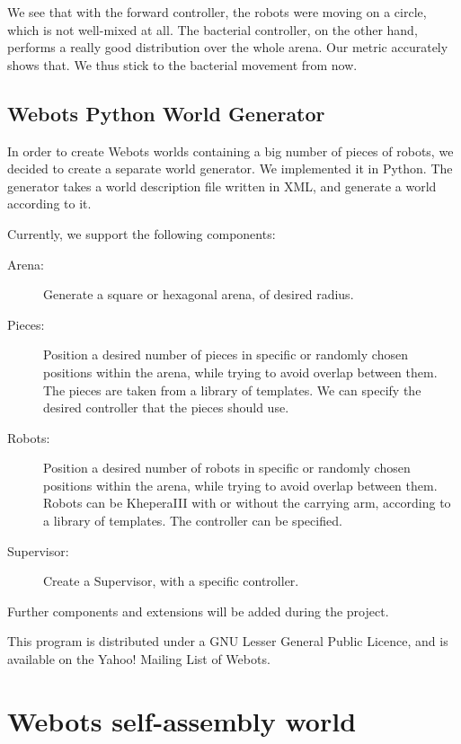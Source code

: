 \documentclass[letterpaper, oneside]{article}
\begin{document}
We see that with the forward controller, the robots were moving on a circle, which is not well-mixed at all. The bacterial controller, on the other hand, performs a really good distribution over the whole arena. Our metric accurately shows that. We thus stick to the bacterial movement from now.


\subsection{Webots Python World Generator} %
\label{sub:webots_python_world_generator}
In order to create Webots worlds containing a big number of pieces of robots, we decided to create a separate world generator. We implemented it in Python. The generator takes a world description file written in XML, and generate a world according to it.

Currently, we support the following components:

\begin{description}
	\item[Arena:] Generate a square or hexagonal arena, of desired radius.
	\item[Pieces:] Position a desired number of pieces in specific or randomly chosen positions within the arena, while trying to avoid overlap between them. The pieces are taken from a library of templates. We can specify the desired controller that the pieces should use.
	\item[Robots:] Position a desired number of robots in specific or randomly chosen positions within the arena, while trying to avoid overlap between them. Robots can be KheperaIII with or without the carrying arm, according to a library of templates. The controller can be specified.
	\item[Supervisor:] Create a Supervisor, with a specific controller.
\end{description}

Further components and extensions will be added during the project.

This program is distributed under a GNU Lesser General Public Licence, and is available on the Yahoo! Mailing List of Webots.


\section{Webots self-assembly world} %
\label{sec:webots_self_assembly_world}
\end{document}

